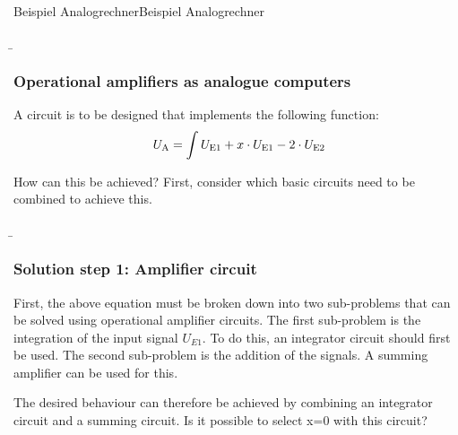 \begin{frame}
{\begin{expl}{Beispiel Analogrechner}{Beispiel Analogrechner}
    \end{expl}


    }
	\b{\frametitle{Operational amplifiers as analogue computers}
        A circuit is to be designed that implements the following function:
        \begin{equation}
            U_{\textnormal{A}} = \int U_{\textnormal{E1}} +x \cdot U_{\textnormal{E1}} - 2\cdot U_{\textnormal{E2}} 
        \end{equation}

        How can this be achieved? First, consider which basic circuits need to be combined to achieve this.  
        }
\end{frame}

\begin{frame}
    \b{
        \frametitle{Solution step 1: Amplifier circuit}
        First, the above equation must be broken down into two sub-problems that can be solved using operational amplifier circuits.
        The first sub-problem is the integration of the input signal $U_{E1}$. To do this, an integrator circuit should first be used.
        The second sub-problem is the addition of the signals. A summing amplifier can be used for this.
        \begin{figure}[ht]
            \centering
        \end{figure}
        The desired behaviour can therefore be achieved by combining an integrator circuit and a summing circuit. Is it possible to select x=0 with this circuit?
        }
\end{frame}

